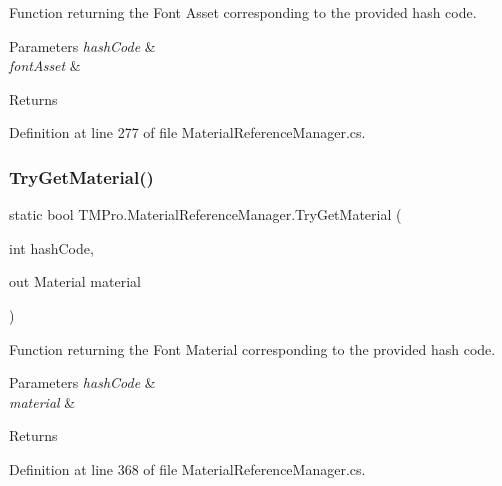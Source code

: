 Function returning the Font Asset corresponding to the provided hash code. 


\begin{DoxyParams}{Parameters}
{\em hash\+Code} & \\
\hline
{\em font\+Asset} & \\
\hline
\end{DoxyParams}
\begin{DoxyReturn}{Returns}

\end{DoxyReturn}


Definition at line 277 of file Material\+Reference\+Manager.\+cs.

\mbox{\label{class_t_m_pro_1_1_material_reference_manager_a4826b2b5ac5de579423e0eaee6955dfc}} 
\subsubsection{\texorpdfstring{TryGetMaterial()}{TryGetMaterial()}}
{\footnotesize\ttfamily static bool T\+M\+Pro.\+Material\+Reference\+Manager.\+Try\+Get\+Material (\begin{DoxyParamCaption}\item[{int}]{hash\+Code,  }\item[{out Material}]{material }\end{DoxyParamCaption})\hspace{0.3cm}{\ttfamily [static]}}



Function returning the Font Material corresponding to the provided hash code. 


\begin{DoxyParams}{Parameters}
{\em hash\+Code} & \\
\hline
{\em material} & \\
\hline
\end{DoxyParams}
\begin{DoxyReturn}{Returns}

\end{DoxyReturn}


Definition at line 368 of file Material\+Reference\+Manager.\+cs.

\mbox{\label{class_t_m_pro_1_1_material_reference_manager_a134f55b51c7660176516e2fe3b71d4ae}} 
